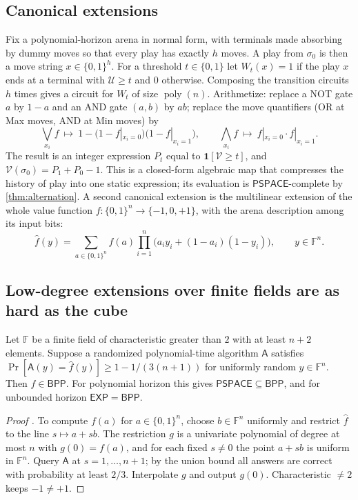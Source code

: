 \documentclass[final]{siamart0516}
\numberwithin{theorem}{section}
\numberwithin{equation}{section}
\theoremstyle{siamnonum}
\theoremstyle{plain}
\newcommand{\FF}{\mathbb{F}}
\newcommand{\val}{\mathcal{V}}            %
\newcommand{\pay}{\mathcal{U}}            %
\newcommand{\poly}{\operatorname{poly}}
\newcommand{\cls}[1]{\mathsf{#1}}
\newcommand{\PSPACE}{\cls{PSPACE}}
\newcommand{\EXP}{\cls{EXP}}
\newcommand{\BPP}{\cls{BPP}}
\newcommand{\one}{\mathbf{1}}
\begin{document}
\subsection{Canonical extensions}
Fix a polynomial-horizon arena in normal form, with terminals made absorbing by dummy moves so that every play has exactly $h$ moves. A play from $\sigma_0$ is then a move string $x\in\{0,1\}^h$. For a threshold $t\in\{0,1\}$ let $W_t(x)=1$ if the play $x$ ends at a terminal with $\pay\ge t$ and $0$ otherwise. Composing the transition circuits $h$ times gives a circuit for $W_t$ of size $\poly(n)$. Arithmetize: replace a NOT gate $a$ by $1-a$ and an AND gate $(a,b)$ by $ab$; replace the move quantifiers (OR at Max moves, AND at Min moves) by
\[
\textstyle\bigvee_{x_i}f\ \mapsto\ 1-\bigl(1-f|_{x_i=0}\bigr)\bigl(1-f|_{x_i=1}\bigr),\qquad \bigwedge_{x_i}f\ \mapsto\ f|_{x_i=0}\cdot f|_{x_i=1}.
\]
The result is an integer expression $P_t$ equal to $\one[\val\ge t]$, and $\val(\sigma_0)=P_1+P_0-1$. This is a closed-form algebraic map that compresses the history of play into one static expression; its evaluation is $\PSPACE$-complete by \cref{thm:alternation}. A second canonical extension is the multilinear extension of the whole value function $f\colon\{0,1\}^n\to\{-1,0,+1\}$, with the arena description among its input bits:
\[
\widehat f(y)=\sum_{a\in\{0,1\}^n}f(a)\prod_{i=1}^{n}\bigl(a_iy_i+(1-a_i)(1-y_i)\bigr),\qquad y\in\FF^n.
\]

\subsection{Low-degree extensions over finite fields are as hard as the cube}

\begin{theorem}\label{thm:worst-average}
Let $\FF$ be a finite field of characteristic greater than $2$ with at least $n+2$ elements. Suppose a randomized polynomial-time algorithm $\mathsf A$ satisfies $\Pr[\mathsf A(y)=\widehat f(y)]\ge 1-1/(3(n+1))$ for uniformly random $y\in\FF^n$. Then $f\in\BPP$. For polynomial horizon this gives $\PSPACE\subseteq\BPP$, and for unbounded horizon $\EXP=\BPP$.
\end{theorem}

\begin{proof}[Proof \textup{\cite{BeaverFeigenbaum,Lipton}}]
To compute $f(a)$ for $a\in\{0,1\}^n$, choose $b\in\FF^n$ uniformly and restrict $\widehat f$ to the line $s\mapsto a+sb$. The restriction $g$ is a univariate polynomial of degree at most $n$ with $g(0)=f(a)$, and for each fixed $s\neq0$ the point $a+sb$ is uniform in $\FF^n$. Query $\mathsf A$ at $s=1,\dots,n+1$; by the union bound all answers are correct with probability at least $2/3$. Interpolate $g$ and output $g(0)$. Characteristic $\neq2$ keeps $-1\neq+1$.
\end{proof}
\end{document}
